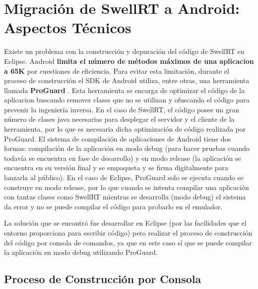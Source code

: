 \newpage
\thispagestyle{sectioned}

\appendix


\chapter{Migración de SwellRT a Android: Aspectos Técnicos}
 	
	Existe un problema con la construcción y depuración del código de SwellRT en Eclipse. Android \textbf{limita el número de métodos máximos de una aplicacion a 65K} \cite{ref:android_limit65k} por cuestiones de eficiencia. Para evitar esta limitación, durante el proceso de construcción el SDK de Android utiliza, entre otras, una herramienta llamada \textbf{ProGuard} \cite{ref:android_proguard}. Esta herramienta se encarga de optimizar el código de la aplicacion buscando remover clases que no se utilizan y ofuscando el código para prevenir la ingeniería inversa. En el caso de SwellRT, el código posee un gran número de clases java necesarias para desplegar el servidor y el cliente de la herramienta, por lo que es necesaria dicha optimización de código realizada por ProGuard. El sistema de compilación de aplicaciones de Android tiene dos formas: compilación de la aplicación en modo debug (para hacer pruebas cuando todavía se encuentra en fase de desarrollo) y en modo release (la aplicación se encuentra en su versión final y se empaqueta y se firma digitalmente para lanzarla al público). En el caso de Eclipse, ProGuard solo se ejecuta cuando se construye en modo release, por lo que cuando se intenta compilar una aplicación con tantas clases como SwellRT mientras se desarrolla (modo debug) el sistema da error y no se puede compilar el código para probarlo en el emulador.

	La solución que se encontró fue desarrollar en Eclipse (por las facilidades que el entorno proporciona para escribir código) pero realizar el proceso de construcción del código por consola de comandos, ya que en este caso sí que se puede compilar la aplicación en modo debug utilizando ProGuard.

\section{Proceso de Construcción por Consola}

